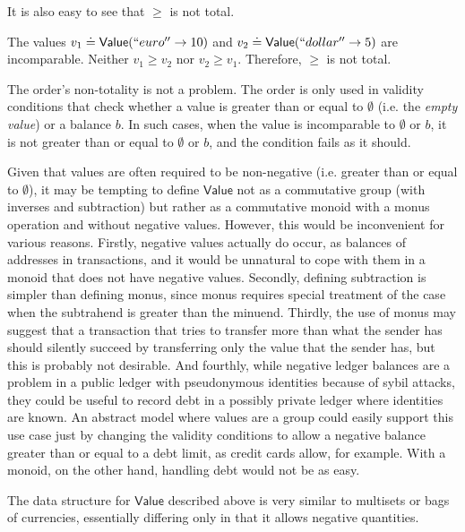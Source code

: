 \documentclass{llncs}
\newcommand{\expeq}{\doteq}
\newcommand{\type}[1]{\mathsf{#1}}
\newcommand{\valueT}{\type{Value}}
\begin{document}
It is also easy to see that $\ge$ is not total.

\begin{example}
The values $v_1 \expeq \valueT(``euro'' \rightarrow 10)$ and $v_2 \expeq \valueT(``dollar'' \rightarrow 5)$ are incomparable. Neither $v_1 \ge v_2$ nor $v_2 \ge v_1$. Therefore, $\ge$ is not total.
\end{example}

The order's non-totality is not a problem. The order is only used in validity conditions that check whether a value is greater than or equal to $\emptyset$ (i.e. the \emph{empty value}) or a balance $b$. In such cases, when the value is incomparable to $\emptyset$ or $b$, it is not greater than or equal to $\emptyset$ or $b$, and the condition fails as it should.

Given that values are often required to be non-negative (i.e. greater than or equal to $\emptyset$), it may be tempting to define $\valueT$ not as a commutative group (with inverses and subtraction) but rather as a commutative monoid with a monus operation and without negative values. However, this would be inconvenient for various reasons. Firstly, negative values actually do occur, as balances of addresses in transactions, and it would be unnatural to cope with them in a monoid that does not have negative values. Secondly, defining subtraction is simpler than defining monus, since monus requires special treatment of the case when the subtrahend is greater than the minuend. Thirdly, the use of monus may suggest that a transaction that tries to transfer more than what the sender has should silently succeed by transferring only the value that the sender has, but this is probably not desirable. And fourthly, while negative ledger balances are a problem in a public ledger with pseudonymous identities because of sybil attacks, they could be useful to record debt in a possibly private ledger where identities are known. An abstract model where values are a group could easily support this use case just by changing the validity conditions to allow a negative balance greater than or equal to a debt limit,
as credit cards allow, for example. With a monoid, on the other hand, handling debt would not be as easy. 

The data structure for $\valueT$ described above is very similar to multisets or bags of currencies, essentially differing only in that it allows negative quantities.
\end{document}
